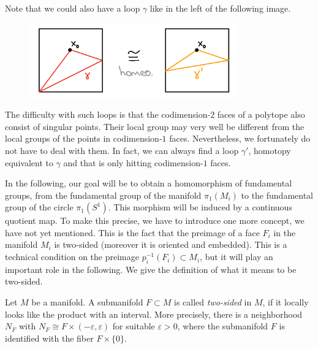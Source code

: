 \begin{remark}
    Note that we could also have a loop \(\gamma\) like in the left of the following image.
    \begin{figure}[h!]
        \label{fig:badray}
        \centering
        \includegraphics[height=3.2cm]{gfx/Equivalent loops.png}
    \end{figure}\vspace*{-\parskip}

    \noindent
    The difficulty with such loops is that the codimension-\(2\) faces of a polytope also consist of singular points.
    Their local group may very well be different from the local groups of the points in codimension-\(1\) faces.
    Nevertheless, we fortunately do not have to deal with them.
    In fact, we can always find a loop \(\gamma'\), homotopy equivalent to \(\gamma\) and that is only hitting codimension-\(1\) faces.
\end{remark}

In the following, our goal will be to obtain a homomorphism of fundamental groups, from the fundamental group of the manifold \(\pi_1(M_i)\) to the fundamental group of the circle \(\pi_1(S^1)\).
This morphism will be induced by a continuous quotient map.
To make this precise, we have to introduce one more concept, we have not yet mentioned.
This is the fact that the preimage of a face \(F_i\) in the manifold \(M_i\) is two-sided (moreover it is oriented and embedded).
This is a technical condition on the preimage \(p_i^{-1}(F_i) \subset M_i\), but it will play an important role in the following.
We give the definition of what it means to be two-sided.

\begin{definition}
    Let \(M\) be a manifold.
    A submanifold \(F \subset M\) is called \emph{two-sided} in \(M\), if it locally looks like the product with an interval.
    More precisely, there is a neighborhood \(N_F\) with \(N_F \cong F \times (-\varepsilon, \varepsilon)\) for suitable \(\varepsilon > 0\), where the submanifold \(F\) is identified with the fiber \(F \times \{0\}\).
\end{definition}

